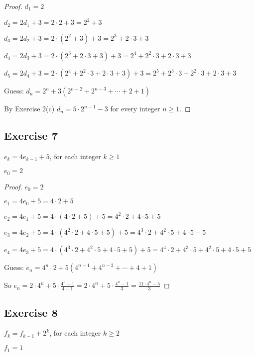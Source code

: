 \documentclass[14pt]{extarticle}
\newcommand{\dps}{\displaystyle}
\begin{document}
    \begin{proof}
        \(d_1 = 2\)

        \(d_2 = 2d_1 + 3 = 2 \cdot 2 + 3 = 2^2 + 3\)

        \(d_3 = 2d_2 + 3 = 2 \cdot (2^2 + 3) + 3 = 2^3 + 2 \cdot 3 + 3\)

        \(d_4 = 2d_3 + 3 = 2 \cdot (2^3 + 2 \cdot 3 + 3) + 3 = 2^4 + 2^2 \cdot 3 + 2 \cdot 3 + 3\)

        \(d_5 = 2d_4 + 3 = 2 \cdot (2^4 + 2^2 \cdot 3 + 2 \cdot 3 + 3) + 3 = 2^5 + 2^3 \cdot 3 + 2^2 \cdot 3 + 2 \cdot 3 + 3\)

        Guess: \(d_n = 2^n + 3(2^{n-2} + 2^{n-3} + \cdots + 2 + 1)\)

        By Exercise 2(c) \(d_n = 5 \cdot 2^{n-1} - 3\) for every integer \(n \geq 1\).
    \end{proof}

    \subsection{Exercise 7}
    \(e_k = 4e_{k-1} + 5\), for each integer \(k \geq 1\)

    \(e_0 = 2\)

    \begin{proof}
        \(e_0 = 2\)

        \(e_1 = 4e_0 + 5 = 4 \cdot 2 + 5\)

        \(e_2 = 4e_1 + 5 = 4 \cdot (4 \cdot 2 + 5) + 5 = 4^2 \cdot 2 + 4 \cdot 5 + 5\)

        \(e_3 = 4e_2 + 5 = 4 \cdot (4^2 \cdot 2 + 4 \cdot 5 + 5) + 5 = 4^3 \cdot 2 + 4^2 \cdot 5 + 4 \cdot 5 + 5\)

        \(e_4 = 4e_3 + 5 = 4 \cdot (4^3 \cdot 2 + 4^2 \cdot 5 + 4 \cdot 5 + 5) + 5
        = 4^4 \cdot 2 + 4^3 \cdot 5 + 4^2 \cdot 5 + 4 \cdot 5 + 5\)

        Guess: \(e_n = 4^n \cdot 2 + 5(4^{n-1} + 4^{n-2} + \cdots + 4 + 1)\)

        So \(\dps e_n = 2 \cdot 4^n + 5 \cdot \frac{4^n - 1}{4-1} = 2 \cdot 4^n + 5 \cdot \frac{4^n - 1}{3} = \frac{11 \cdot 4^n - 5}{3}\)
    \end{proof}

    \subsection{Exercise 8}
    \(f_k = f_{k-1} + 2^k\), for each integer \(k \geq 2\)

    \(f_1 = 1\)
\end{document}
